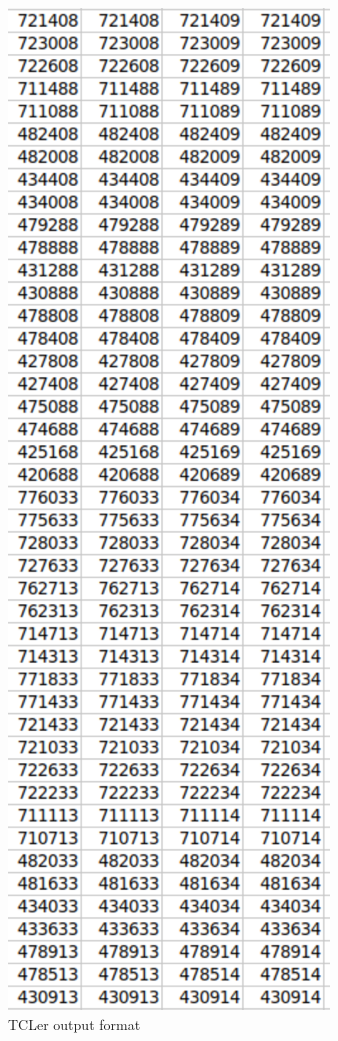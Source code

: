 \documentclass[letterpaper, 10 pt, conference]{IEEEconf}  %
\begin{document}
\begin{figure}[H]
\centering
\includegraphics[scale=.5]{outputparser.png} 
\caption{TCLer output format}
\end{figure}
\end{document}
